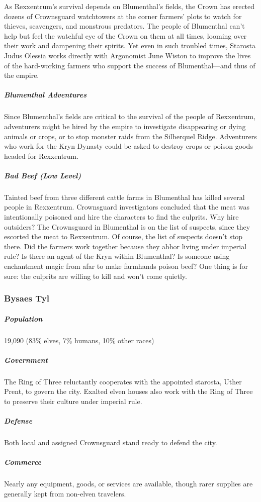 \documentclass[10pt,a4paper,twoside,bg=print,twocolumn,openany,nodeprecatedcode]{dndbook}
\begin{document}
As Rexxentrum's survival depends on Blumenthal's fields, the Crown has erected dozens of Crownsguard watchtowers at the corner farmers' plots to watch for thieves, scavengers, and monstrous predators. The people of Blumenthal can't help but feel the watchful eye of the Crown on them at all times, looming over their work and dampening their spirits. Yet even in such troubled times, Starosta Judus Olessia works directly with Argonomist June Wiston to improve the lives of the hard-working farmers who support the success of Blumenthal—and thus of the empire.

\subparagraph{Blumenthal Adventures}
Since Blumenthal's fields are critical to the survival of the people of Rexxentrum, adventurers might be hired by the empire to investigate disappearing or dying animals or crops, or to stop monster raids from the Silberquel Ridge. Adventurers who work for the Kryn Dynasty could be asked to destroy crops or poison goods headed for Rexxentrum.

\subparagraph{Bad Beef (Low Level)}
Tainted beef from three different cattle farms in Blumenthal has killed several people in Rexxentrum. Crownsguard investigators concluded that the meat was intentionally poisoned and hire the characters to find the culprits. Why hire outsiders? The Crownsguard in Blumenthal is on the list of suspects, since they escorted the meat to Rexxentrum. Of course, the list of suspects doesn't stop there. Did the farmers work together because they abhor living under imperial rule? Is there an agent of the Kryn within Blumenthal? Is someone using enchantment magic from afar to make farmhands poison beef? One thing is for sure: the culprits are willing to kill and won't come quietly.

\subsubsection{Bysaes Tyl}
\subparagraph{Population}
19,090 (83\% elves, 7\% humans, 10\% other races)

\subparagraph{Government}
The Ring of Three reluctantly cooperates with the appointed starosta, Uther Prent, to govern the city. Exalted elven houses also work with the Ring of Three to preserve their culture under imperial rule.

\subparagraph{Defense}
Both local and assigned Crownsguard stand ready to defend the city.

\subparagraph{Commerce}
Nearly any equipment, goods, or services are available, though rarer supplies are generally kept from non-elven travelers.
\end{document}
